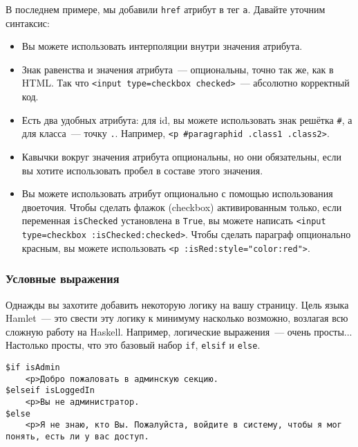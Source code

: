 В последнем примере, мы добавили \texttt{href} атрибут в тег \texttt{a}.
Давайте уточним синтаксис:

\begin{itemize}
    \item Вы можете использовать интерполяции внутри значения атрибута.

    \item Знак равенства и значения атрибута~--- опциональны, точно так же, как в
        HTML.  Так что \lstinline'<input type=checkbox checked>'~---
        абсолютно корректный код.

    \item Есть два удобных атрибута: для id, вы можете использовать знак
        решётка \lstinline'#', а для класса~--- точку \lstinline'.'. Например,
        \lstinline'<p #paragraphid .class1 .class2>'.

    \item Кавычки вокруг значения атрибута опциональны, но они обязательны,
        если вы хотите использовать пробел в составе этого значения.

    \item Вы можете использовать атрибут опционально с помощью использования
        двоеточия.  Чтобы сделать флажок (checkbox) активированным только, если
        переменная \lstinline'isChecked'  установлена в \lstinline'True', вы
        можете написать \lstinline'<input type=checkbox :isChecked:checked>'.
        Чтобы сделать параграф опционально красным, вы можете использовать
        \lstinline'<p :isRed:style="color:red">'.
\end{itemize}

\subsubsection{Условные выражения}

Однажды вы захотите добавить некоторую логику на вашу страницу. Цель языка
Hamlet~--- это свести эту логику к минимуму насколько возможно, возлагая всю
сложную работу на Haskell. Например, логические выражения~--- очень просты...
Настолько просты, что это базовый набор \lstinline'if', \lstinline'elsif' и
\lstinline'else'.

\begin{lstlisting}
$if isAdmin
    <p>Добро пожаловать в админскую секцию.
$elseif isLoggedIn
    <p>Вы не администратор.
$else
    <p>Я не знаю, кто Вы. Пожалуйста, войдите в систему, чтобы я мог понять, есть ли у вас доступ.
\end{lstlisting}

